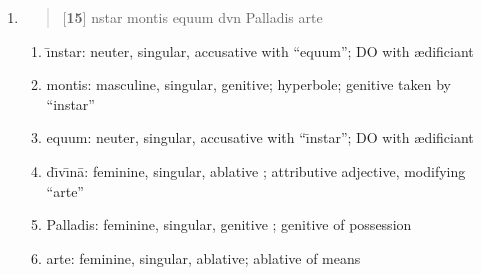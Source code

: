 \documentclass[]{article}
\newcommand{\latify}[1]{
        \Large
        \begin{verse}
          \begin{metrica}
          {#1}\\
          \end{metrica}
        \end{verse}
        \normalsize
}
\begin{document}
\begin{enumerate}
\item \latify{[\textbf{15}] {\macron {\i}}nstar montis equum d{\macron {\i}}v{\macron {\i}}n{\macron {a}} Palladis arte}     
\begin{enumerate}

	\item \={\i}nstar: neuter, singular, accusative with ``equum''; DO with {\ae}dificiant

	\item montis: masculine, singular, genitive; hyperbole; genitive taken by ``instar''

	\item equum: neuter, singular, accusative with ``\={\i}nstar''; DO with {\ae}dificiant

	\item d\={\i}v\={\i}n\={a}:   feminine, singular, ablative ; attributive adjective, modifying ``arte''

	\item Palladis: feminine, singular, genitive ; genitive of possession

	\item arte: feminine, singular, ablative; ablative of means

\end{enumerate}
        
\end{enumerate}
\end{document}
